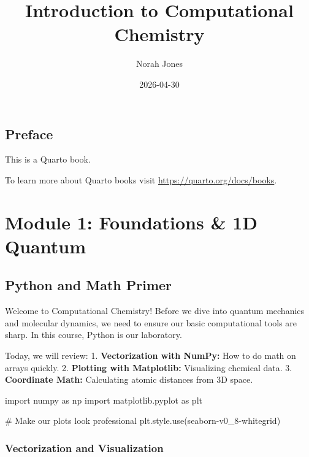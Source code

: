 \documentclass[
  letterpaper,
  DIV=11,
  numbers=noendperiod]{scrreprt}
\title{Introduction to Computational Chemistry}
\author{Norah Jones}
\date{2026-04-30}
\newenvironment{Shaded}{\begin{snugshade}}{\end{snugshade}}
\newcommand{\CommentTok}[1]{\textcolor[rgb]{0.37,0.37,0.37}{#1}}
\newcommand{\ImportTok}[1]{\textcolor[rgb]{0.00,0.46,0.62}{#1}}
\newcommand{\NormalTok}[1]{\textcolor[rgb]{0.00,0.23,0.31}{#1}}
\newcommand{\StringTok}[1]{\textcolor[rgb]{0.13,0.47,0.30}{#1}}
\renewcommand*\contentsname{Table of contents}
\newcommand\contentsname{Table of contents}
\begin{document}
\maketitle

\renewcommand*\contentsname{Table of contents}
{
\setcounter{tocdepth}{2}
\tableofcontents
}


\chapter*{Preface}\label{preface}


This is a Quarto book.

To learn more about Quarto books visit
\url{https://quarto.org/docs/books}.

\part{Module 1: Foundations \& 1D Quantum}

\chapter{Python and Math Primer}\label{python-and-math-primer}

Welcome to Computational Chemistry! Before we dive into quantum
mechanics and molecular dynamics, we need to ensure our basic
computational tools are sharp. In this course, Python is our laboratory.

Today, we will review: 1. \textbf{Vectorization with NumPy:} How to do
math on arrays quickly. 2. \textbf{Plotting with Matplotlib:}
Visualizing chemical data. 3. \textbf{Coordinate Math:} Calculating
atomic distances from 3D space.

\begin{Shaded}
\begin{Highlighting}[]
\ImportTok{import}\NormalTok{ numpy }\ImportTok{as}\NormalTok{ np}
\ImportTok{import}\NormalTok{ matplotlib.pyplot }\ImportTok{as}\NormalTok{ plt}

\CommentTok{\# Make our plots look professional}
\NormalTok{plt.style.use(}\StringTok{\textquotesingle{}seaborn{-}v0\_8{-}whitegrid\textquotesingle{}}\NormalTok{)}
\end{Highlighting}
\end{Shaded}

\section{Vectorization and
Visualization}\label{vectorization-and-visualization}
\end{document}
